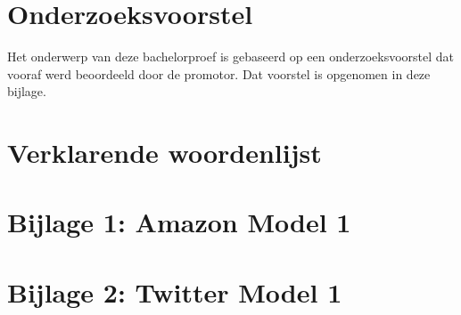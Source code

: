 \documentclass{bachproef-tin}
\begin{document}
%
%




\appendix
\renewcommand{\chaptername}{Appendix}


\chapter{Onderzoeksvoorstel}

Het onderwerp van deze bachelorproef is gebaseerd op een onderzoeksvoorstel dat vooraf werd beoordeeld door de promotor. Dat voorstel is opgenomen in deze bijlage.



\chapter{Verklarende woordenlijst}

\chapter{Bijlage 1: Amazon Model 1}

\chapter{Bijlage 2: Twitter Model 1}

\clearpage


\printbibliography[heading=bibintoc]
\end{document}

